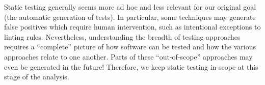 

    Static testing generally seems more ad hoc and less relevant for our
    original goal (the automatic generation of tests). In particular,
    some techniques may generate false positives which require human intervention,
    such as intentional exceptions to linting rules. Nevertheless, understanding
    the breadth of testing approaches requires a ``complete'' picture of how
    software can be tested and how the various approaches relate to one another.
    Parts of these ``out-of-scope'' approaches may even be generated in the
    future! Therefore, we keep static testing in-scope at this stage of the
    analysis.

